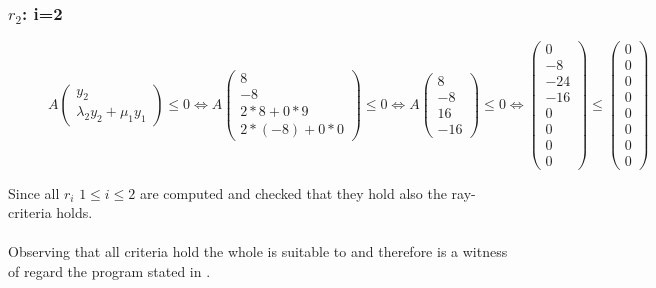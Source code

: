 	\subsubsection{$r_2$: i=2}
	\begin{figure}[H]
		\centering
		$A\begin{pmatrix} y_2 \\ \lambda_2y_2+\mu_1y_1 \end{pmatrix} \le 0 \Leftrightarrow A\begin{pmatrix} 8 \\ -8 \\ 2*8+0*9 \\ 2*(-8)+0*0 \end{pmatrix} \le 0 \Leftrightarrow A\begin{pmatrix} 8 \\ -8 \\ 16 \\ -16 \end{pmatrix} \le 0 \Leftrightarrow \begin{pmatrix} 0 \\ -8 \\ -24 \\ -16 \\ 0 \\ 0 \\ 0 \\ 0 \end{pmatrix} \le \begin{pmatrix} 0 \\ 0 \\ 0 \\ 0 \\ 0 \\ 0 \\ 0 \\ 0 \end{pmatrix}$
	\end{figure}

	Since all $r_i$ $1\le i \le 2$ are computed and checked that they hold also the ray-criteria holds.
	\\
	\\
	Observing that all criteria hold the whole \gna is suitable to  and therefore is a witness of \nonterm regard the program stated in .
	
